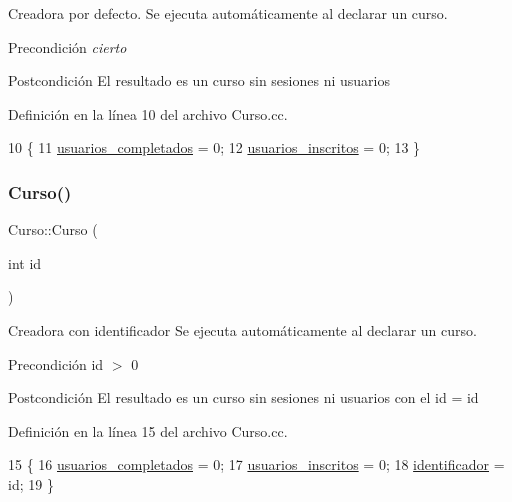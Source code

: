 Creadora por defecto. Se ejecuta automáticamente al declarar un curso. 

\begin{DoxyPrecond}{Precondición}
{\itshape cierto} 
\end{DoxyPrecond}
\begin{DoxyPostcond}{Postcondición}
El resultado es un curso sin sesiones ni usuarios 
\end{DoxyPostcond}


Definición en la línea 10 del archivo Curso.\+cc.


\begin{DoxyCode}
10              \{
11   \mbox{\hyperlink{class_curso_a63f5480299c87c260ba262831ba7a86f}{usuarios\_completados}} = 0;
12   \mbox{\hyperlink{class_curso_a94c41191b9cd9dc8af95e7d2560a2381}{usuarios\_inscritos}} = 0;
13 \}
\end{DoxyCode}
\mbox{\label{class_curso_a88bafa52e2ad615cedc04918453ff59c}} 
\subsubsection{\texorpdfstring{Curso()}{Curso()}\hspace{0.1cm}{\footnotesize\ttfamily [2/2]}}
{\footnotesize\ttfamily Curso\+::\+Curso (\begin{DoxyParamCaption}\item[{int}]{id }\end{DoxyParamCaption})}



Creadora con identificador Se ejecuta automáticamente al declarar un curso. 

\begin{DoxyPrecond}{Precondición}
id $>$ 0 
\end{DoxyPrecond}
\begin{DoxyPostcond}{Postcondición}
El resultado es un curso sin sesiones ni usuarios con el id = id 
\end{DoxyPostcond}


Definición en la línea 15 del archivo Curso.\+cc.


\begin{DoxyCode}
15                    \{
16   \mbox{\hyperlink{class_curso_a63f5480299c87c260ba262831ba7a86f}{usuarios\_completados}} = 0;
17   \mbox{\hyperlink{class_curso_a94c41191b9cd9dc8af95e7d2560a2381}{usuarios\_inscritos}} = 0;
18   \mbox{\hyperlink{class_curso_aa719041069be2a3f1a093a881ae7a105}{identificador}} = id;
19 \}
\end{DoxyCode}
\mbox{\label{class_curso_af81ae2c50caea1382d28441859ca1eb5}} 
